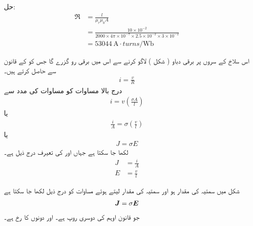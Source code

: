 حل:
\begin{align*}
\Re& = \frac{l}{\mu_r \mu_0 A}\\
&=\frac{10\times 10^{-2}}{2000 \times 4 \pi \times 10^{-7} \times 2.5 \times 10^{-2} \times 3 \times 10^{-2}}\\
&=\SI{53044}{\ampere \cdot turns \per \weber}
\end{align*}

اس سلاخ کے سروں پر برقی دباو  ( شکل  )  لاگو کرنے سے اس میں    برقی رو  گزرے گا جس کو  کے قانون  سے حاصل کرتے ہیں۔
\begin{align}
i=\frac{v}{R}
\end{align}
درج بالا مساوات کو مساوات   کی مدد سے
\begin{align}
i=v \left(\frac{\sigma A}{l}\right)
\end{align}
یا
\begin{align}
\frac{i}{A}=\sigma \left(\frac{v}{l} \right)
\end{align}
یا
\begin{align}\label{مساوات_مقناطیسی_دور_اوہم_قانون_کی_تفرق_شکل}
J =\sigma E
\end{align}
لکھا جا سکتا ہے جہاں   اور  کی تعیرف درج ذیل ہے۔
\begin{align}
J&=\frac{i}{A} \label{مساوات_مقناطیسی_دور_کثافت_رو}\\
E&=\frac{v}{l} \label{مساوات_مقناطیسی_دور_برقی_شدت}
\end{align}

شکل   میں سمتیہ  کی مقدار  ہو اور سمتیہ  کی مقدار  لیتے ہوئے  مساوات  کو درج ذیل لکھا جا سکتا ہے
\begin{align}
{\ensuremath{{\boldsymbol{J}}}}=\sigma {\ensuremath{{\boldsymbol{E}}}}
\end{align}
جو قانون اوہم کی دوسری روپ ہے۔  اور  دونوں کا رخ    ہے۔

